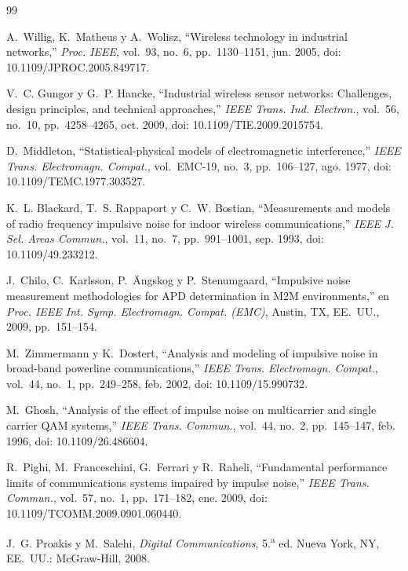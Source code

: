 \begin{thebibliography}{99}
\footnotesize

A.~Willig, K.~Matheus y A.~Wolisz, ``Wireless technology in industrial
networks,'' \emph{Proc. IEEE}, vol.~93, no.~6, pp.~1130--1151, jun. 2005,
doi: 10.1109/JPROC.2005.849717.

V.~C. Gungor y G.~P. Hancke, ``Industrial wireless sensor networks:
Challenges, design principles, and technical approaches,'' \emph{IEEE Trans.
Ind. Electron.}, vol.~56, no.~10, pp.~4258--4265, oct. 2009,
doi: 10.1109/TIE.2009.2015754.

D.~Middleton, ``Statistical-physical models of electromagnetic interference,''
\emph{IEEE Trans. Electromagn. Compat.}, vol.~EMC-19, no.~3, pp.~106--127,
ago. 1977, doi: 10.1109/TEMC.1977.303527.

K.~L. Blackard, T.~S. Rappaport y C.~W. Bostian, ``Measurements and models of
radio frequency impulsive noise for indoor wireless communications,''
\emph{IEEE J. Sel. Areas Commun.}, vol.~11, no.~7, pp.~991--1001, sep. 1993,
doi: 10.1109/49.233212.

J.~Chilo, C.~Karlsson, P.~Ängskog y P.~Stenumgaard, ``Impulsive noise
measurement methodologies for APD determination in M2M environments,'' en
\emph{Proc. IEEE Int. Symp. Electromagn. Compat. (EMC)}, Austin, TX, EE.~UU.,
2009, pp.~151--154.

M.~Zimmermann y K.~Dostert, ``Analysis and modeling of impulsive noise in
broad-band powerline communications,'' \emph{IEEE Trans. Electromagn.
Compat.}, vol.~44, no.~1, pp.~249--258, feb. 2002, doi: 10.1109/15.990732.

M.~Ghosh, ``Analysis of the effect of impulse noise on multicarrier and single
carrier QAM systems,'' \emph{IEEE Trans. Commun.}, vol.~44, no.~2,
pp.~145--147, feb. 1996, doi: 10.1109/26.486604.

R.~Pighi, M.~Franceschini, G.~Ferrari y R.~Raheli, ``Fundamental performance
limits of communications systems impaired by impulse noise,'' \emph{IEEE
Trans. Commun.}, vol.~57, no.~1, pp.~171--182, ene. 2009,
doi: 10.1109/TCOMM.2009.0901.060440.

J.~G. Proakis y M.~Salehi, \emph{Digital Communications}, 5.\textsuperscript{a}
ed. Nueva York, NY, EE.~UU.: McGraw-Hill, 2008.


\end{thebibliography}
